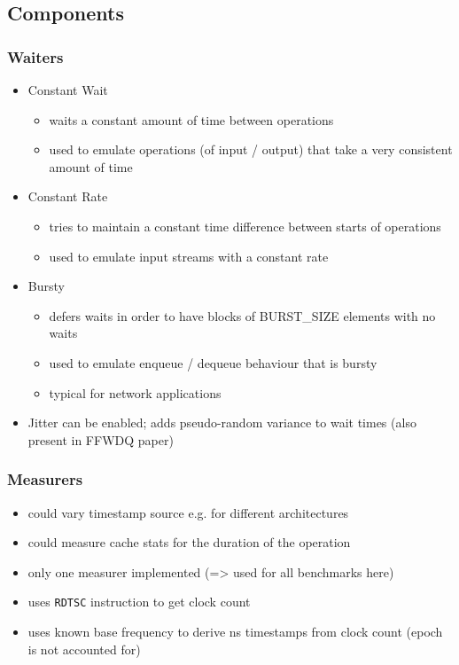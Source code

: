 \subsection{Components}
\subsubsection{Waiters}
\begin{itemize}
    \item Constant Wait
        \begin{itemize}
            \item waits a constant amount of time between operations
            \item used to emulate operations (of input / output) that take a very consistent amount of time
        \end{itemize}
    \item Constant Rate
        \begin{itemize}
            \item tries to maintain a constant time difference between starts of operations
            \item used to emulate input streams with a constant rate
        \end{itemize}
    \item Bursty
        \begin{itemize}
            \item defers waits in order to have blocks of BURST\_SIZE elements with no waits
            \item used to emulate enqueue / dequeue behaviour that is bursty
            \item typical for network applications
        \end{itemize}
    \item Jitter can be enabled; adds pseudo-random variance to wait times (also present in FFWDQ paper)
\end{itemize}

\subsubsection{Measurers}
\begin{itemize}
    \item could vary timestamp source e.g. for different architectures
    \item could measure cache stats for the duration of the operation
    \item only one measurer implemented (=> used for all benchmarks here)
    \item uses \texttt{RDTSC} instruction to get clock count
    \item uses known base frequency to derive ns timestamps from clock count (epoch is not accounted for)
\end{itemize}
